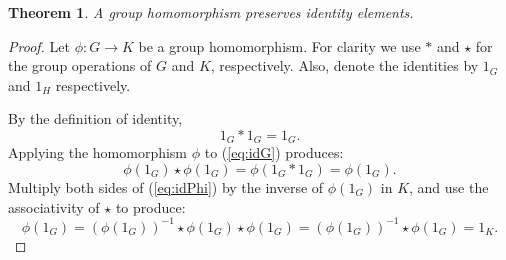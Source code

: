 \documentclass[12pt]{article}
\begin{document}
\newtheorem*{theorem}{Theorem}
\begin{theorem}
A group homomorphism preserves identity elements. 
\end{theorem}
\begin{proof}
Let $\phi:G\to K$ be a group homomorphism.
For clarity we use $\ast$ and $\star$ for the group operations of $G$ and $K$, respectively.  Also,
denote the identities by $1_G$ and $1_H$ respectively.  


By the definition of identity, 
\begin{equation}\label{eq:idG}
 1_G\ast 1_G=1_G.
\end{equation}
Applying the homomorphism $\phi$ to (\ref{eq:idG}) produces:
\begin{equation}\label{eq:idPhi}
 \phi(1_G)\star \phi(1_G)= \phi(1_G\ast 1_G) = \phi (1_G).
\end{equation}
Multiply both sides of (\ref{eq:idPhi}) by the inverse of $\phi(1_G)$ in $K$,
and use the associativity of $\star$ to produce:
\begin{equation}
  \phi(1_G)=(\phi(1_G))^{-1}\star \phi(1_G)\star \phi(1_G)  =  (\phi(1_G))^{-1}\star \phi(1_G)=1_K.
\end{equation}
\end{proof}


\end{document}
